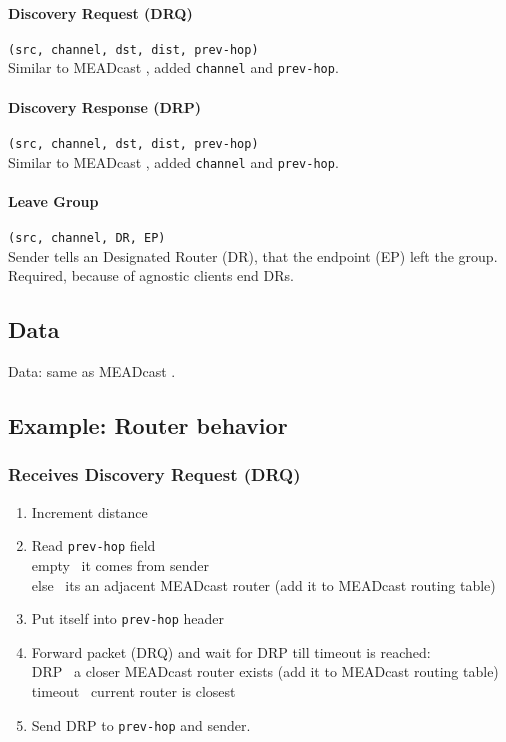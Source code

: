 \paragraph{Discovery Request (DRQ)} %
\label{par:Discovery Request}
\texttt{(src, channel, dst, dist, prev-hop)}\\
Similar to MEADcast \cite{meadcast2}, added \texttt{channel} and \texttt{prev-hop}.

\paragraph{Discovery Response (DRP)} %
\label{par:Discovery Response}
\texttt{(src, channel, dst, dist, prev-hop)}\\
Similar to MEADcast \cite{meadcast2}, added \texttt{channel} and \texttt{prev-hop}.

\paragraph{Leave Group} %
\label{par:Leave Group}
\texttt{(src, channel, DR, EP)}\\
Sender tells an Designated Router (DR), that the endpoint (EP) left the group.
Required, because of agnostic clients end DRs.


\subsection{Data} %
\label{sub:Data}
Data: same as MEADcast \cite{meadcast2}.


\subsection{Example: Router behavior} %
\label{sub:Example: Router behavior}

\subsubsection{Receives Discovery Request (DRQ)}
\begin{enumerate}\itemsep0em
    \item Increment distance
    \item Read \texttt{prev-hop} field\\
        empty \textrightarrow\ it comes from sender\\
        else  \textrightarrow\ its an adjacent MEADcast router (add it to
        MEADcast routing table)
    \item Put itself into \texttt{prev-hop} header
    \item Forward packet (DRQ) and wait for DRP till timeout is reached:\\
        DRP \textrightarrow\ a closer MEADcast router exists (add it to MEADcast
        routing table)\\
        timeout \textrightarrow\ current router is closest
    \item Send DRP to \texttt{prev-hop} and sender.
\end{enumerate}


